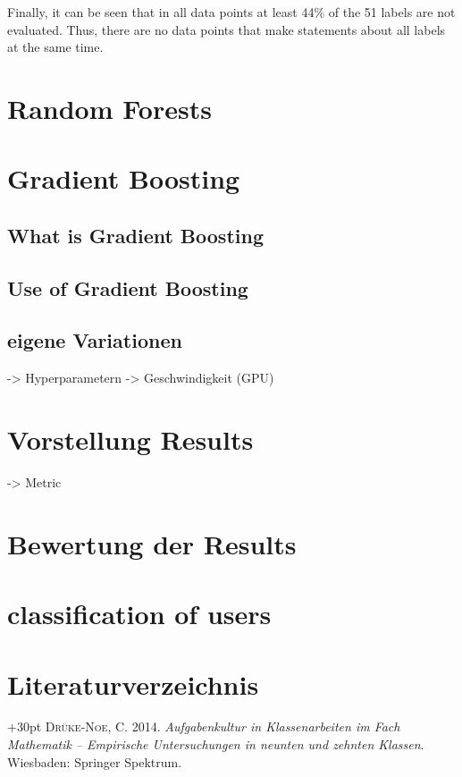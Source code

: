\documentclass[a4paper,12pt]{scrartcl}
\begin{document}
Finally, it can be seen that in all data points at least 44\% of the 51 labels are not evaluated. Thus, there are no data points that make statements about all labels at the same time.

\section{Random Forests}

\section{Gradient Boosting}

\subsection{What is Gradient Boosting}

\subsection{Use of Gradient Boosting}

\subsection{eigene Variationen}
-> Hyperparametern
-> Geschwindigkeit (GPU)


\section{Vorstellung Results}
-> Metric

\section{Bewertung der Results}

\section{classification of users}




\newpage
\section{Literaturverzeichnis}

\hangindent+30pt 
\textsc{Drüke-Noe, C.} 2014. \textit{Aufgabenkultur in Klassenarbeiten im Fach Mathematik – Empirische Untersuchungen in neunten und zehnten Klassen}. Wiesbaden:
Springer Spektrum.
\end{document}
